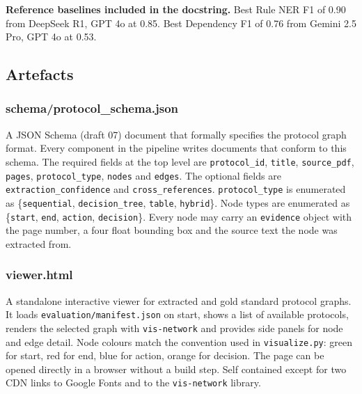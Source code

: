 \documentclass{article}
\begin{document}
\textbf{Reference baselines included in the docstring.} Best Rule NER
F1 of 0.90 from DeepSeek R1, GPT 4o at 0.85. Best Dependency F1 of
0.76 from Gemini 2.5 Pro, GPT 4o at 0.53.

\subsection{Artefacts}

\subsubsection{schema/protocol\_schema.json}

A JSON Schema (draft 07) document that formally specifies the
protocol graph format. Every component in the pipeline writes
documents that conform to this schema. The required fields at the top
level are \texttt{protocol\_id}, \texttt{title}, \texttt{source\_pdf},
\texttt{pages}, \texttt{protocol\_type}, \texttt{nodes} and
\texttt{edges}. The optional fields are \texttt{extraction\_confidence}
and \texttt{cross\_references}. \texttt{protocol\_type} is enumerated
as \{\texttt{sequential}, \texttt{decision\_tree}, \texttt{table},
\texttt{hybrid}\}. Node types are enumerated as
\{\texttt{start}, \texttt{end}, \texttt{action}, \texttt{decision}\}.
Every node may carry an \texttt{evidence} object with the page number,
a four float bounding box and the source text the node was extracted
from.

\subsubsection{viewer.html}

A standalone interactive viewer for extracted and gold standard
protocol graphs. It loads \texttt{evaluation/manifest.json} on start,
shows a list of available protocols, renders the selected graph with
\texttt{vis-network} and provides side panels for node and edge
detail. Node colours match the convention used in
\texttt{visualize.py}: green for start, red for end, blue for action,
orange for decision. The page can be opened directly in a browser
without a build step. Self contained except for two CDN links to
Google Fonts and to the \texttt{vis-network} library.

\end{document}
